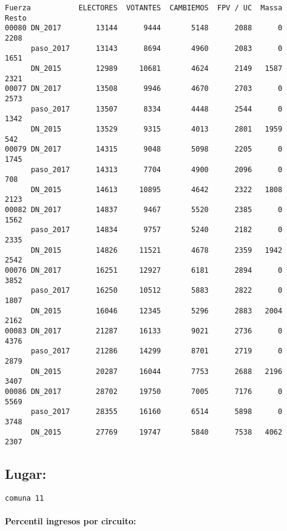 \documentclass[11pt]{article}
\begin{document}
    \begin{verbatim}
Fuerza           ELECTORES  VOTANTES  CAMBIEMOS  FPV / UC  Massa  Resto
00080 DN_2017        13144      9444       5148      2088      0   2208
      paso_2017      13143      8694       4960      2083      0   1651
      DN_2015        12989     10681       4624      2149   1587   2321
00077 DN_2017        13508      9946       4670      2703      0   2573
      paso_2017      13507      8334       4448      2544      0   1342
      DN_2015        13529      9315       4013      2801   1959    542
00079 DN_2017        14315      9048       5098      2205      0   1745
      paso_2017      14313      7704       4900      2096      0    708
      DN_2015        14613     10895       4642      2322   1808   2123
00082 DN_2017        14837      9467       5520      2385      0   1562
      paso_2017      14834      9757       5240      2182      0   2335
      DN_2015        14826     11521       4678      2359   1942   2542
00076 DN_2017        16251     12927       6181      2894      0   3852
      paso_2017      16250     10512       5883      2822      0   1807
      DN_2015        16046     12345       5296      2883   2004   2162
00083 DN_2017        21287     16133       9021      2736      0   4376
      paso_2017      21286     14299       8701      2719      0   2879
      DN_2015        20287     16044       7753      2688   2196   3407
00086 DN_2017        28702     19750       7005      7176      0   5569
      paso_2017      28355     16160       6514      5898      0   3748
      DN_2015        27769     19747       5840      7538   4062   2307
    \end{verbatim}

    
    \hypertarget{lugar}{%
\subsection{Lugar:}\label{lugar}}

    
    \begin{Verbatim}[commandchars=\\\{\}]
comuna 11

    \end{Verbatim}

    \hypertarget{percentil-ingresos-por-circuito}{%
\paragraph{Percentil ingresos por
circuito:}\label{percentil-ingresos-por-circuito}}
\end{document}
